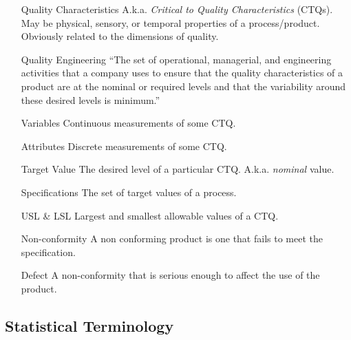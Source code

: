 \documentclass[12pt,a4paper]{report}
\begin{document}
\begin{enumerate}
\item [Quality Characteristics] A.k.a. \emph{Critical to Quality Characteristics} (CTQs). May be physical, sensory, or temporal properties of a process/product. Obviously related to the dimensions of quality. 

\item [Quality Engineering] ``The set of operational, managerial, and engineering activities
that a company uses to ensure that the quality characteristics of a product are at the nominal
or required levels and that the variability around these desired levels is minimum.'' \citep{montgomery_introduction_2007}

\item [Variables] Continuous measurements of some CTQ.

\item [Attributes] Discrete measurements of some CTQ.

\item [Target Value] The desired level of a particular CTQ. A.k.a. \emph{nominal} value. 

\item [Specifications] The set of target values of a process. 

\item [USL \& LSL] Largest and smallest allowable values of a CTQ.

\item [Non-conformity] A non conforming product is one that fails to meet the specification.

\item [Defect] A non-conformity that is serious enough to affect the use of the product.
\end{enumerate}




\subsection{Statistical Terminology}
\end{document}

